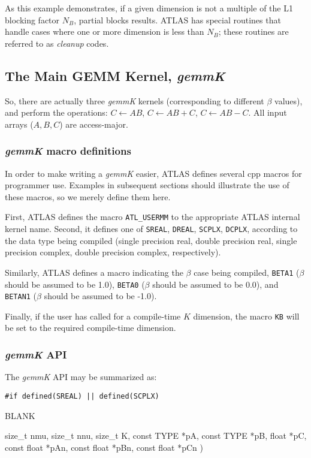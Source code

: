 \documentclass[11pt]{article}
\newenvironment{routdef}[1]
{
   \begin{list}{BLANK}
   {
      \setlength{\parsep}{0in}
      \setlength{\itemsep}{.01in}
      \setlength{\partopsep}{0in}
      \setlength{\topsep}{0.1in}
      \setlength{\labelsep}{0in}
      \setlength{\labelwidth}{#1in}
      \setlength{\leftmargin}{#1in}
   }
} {\end{list}}
\newcommand{\rditem}[2]{\item[#1\hfill(~]#2 )}
\begin{document}
As this example demonstrates, if a given dimension is not a multiple of
the L1 blocking factor $N_B$, partial blocks results.  ATLAS has special
routines that handle cases where one or more dimension is less than $N_B$;
these routines are referred to as {\em cleanup} codes.

\subsection{The Main GEMM Kernel, {\it gemmK}}
So, there are actually three {\it gemmK} kernels (corresponding to different
$\beta$ values), and perform the operations:
$C \leftarrow A B$,
$C \leftarrow A B + C$,
$C \leftarrow A B - C$.  All input arrays ($A, B, C$) are
access-major. 

\subsubsection{{\it gemmK}  macro definitions}
In order to make writing a {\it gemmK} easier, ATLAS defines several 
cpp macros for programmer use.  Examples in subsequent sections should 
illustrate the use of these macros, so we merely define them here.

First, ATLAS defines the macro {\tt ATL\_USERMM}
to the appropriate ATLAS internal kernel name.  Second, it defines one
of  {\tt SREAL}, {\tt DREAL}, {\tt SCPLX}, {\tt DCPLX}, according to
the data type being compiled (single precision real, double precision
real, single precision complex, double precision complex, respectively).

Similarly, ATLAS defines a macro indicating the $\beta$ case being
compiled, {\tt BETA1} ($\beta$ should be assumed to be 1.0), {\tt BETA0}
($\beta$ should be assumed to be 0.0), and {\tt BETAN1}
($\beta$ should be assumed to be -1.0).

Finally, if the user has called for a compile-time $K$ dimension,
the macro {\tt KB} will be set to the required compile-time dimension.

\subsubsection{{\it gemmK} API}
The {\it gemmK} API may be summarized as:

\vspace*{.1in}

\noindent
\verb+#if defined(SREAL) || defined(SCPLX)+
\begin{routdef}{1.8}
\rditem{~~~void ATL\_USERMM}
{size_t nmu, size_t nnu, size_t K, const TYPE *pA, const TYPE *pB, float *pC,
 const float *pAn, const float *pBn, const float *pCn}
\end{routdef}
\end{document}
